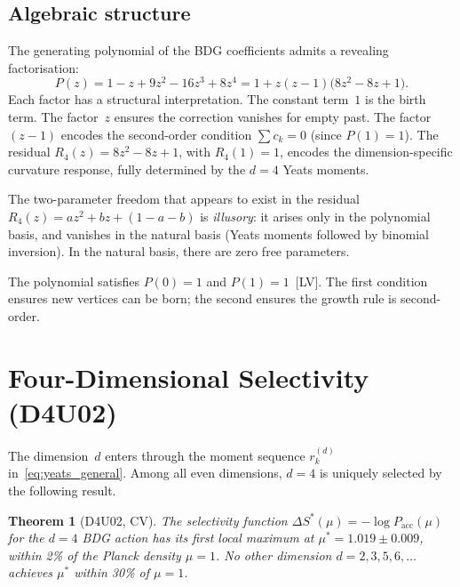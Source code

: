 \documentclass[12pt,a4paper]{article}
\newtheorem{theorem}{Theorem}[section]
\begin{document}
\subsection{Algebraic structure}\label{sec:algebra}

The generating polynomial of the BDG coefficients admits a revealing factorisation:
\begin{equation}
P(z) = 1 - z + 9z^2 - 16z^3 + 8z^4 = 1 + z(z-1)\bigl(8z^2 - 8z + 1\bigr).
\label{eq:factorisation}
\end{equation}
Each factor has a structural interpretation. The constant term~$1$ is the birth term. The factor~$z$ ensures the correction vanishes for empty past. The factor $(z-1)$ encodes the second-order condition $\sum c_k = 0$ (since $P(1) = 1$). The residual $R_4(z) = 8z^2 - 8z + 1$, with $R_4(1)=1$, encodes the dimension-specific curvature response, fully determined by the $d=4$ Yeats moments.

The two-parameter freedom that appears to exist in the residual $R_4(z) = az^2 + bz + (1\!-\!a\!-\!b)$ is \emph{illusory}: it arises only in the polynomial basis, and vanishes in the natural basis (Yeats moments followed by binomial inversion). In the natural basis, there are zero free parameters.

The polynomial satisfies $P(0) = 1$ and $P(1) = 1$~[LV]. The first condition ensures new vertices can be born; the second ensures the growth rule is second-order.

\section{Four-Dimensional Selectivity (D4U02)}\label{sec:d4u02}

The dimension~$d$ enters through the moment sequence $r_k^{(d)}$ in~\eqref{eq:yeats_general}. Among all even dimensions, $d=4$ is uniquely selected by the following result.

\begin{theorem}[D4U02, CV]\label{thm:d4u02}
The selectivity function $\Delta S^*(\mu) = -\log P_{\mathrm{acc}}(\mu)$ for the $d=4$ BDG action has its first local maximum at $\mu^* = 1.019 \pm 0.009$, within 2\% of the Planck density $\mu=1$. No other dimension $d = 2,3,5,6,\ldots$ achieves $\mu^*$ within 30\% of $\mu=1$.
\end{theorem}
\end{document}
